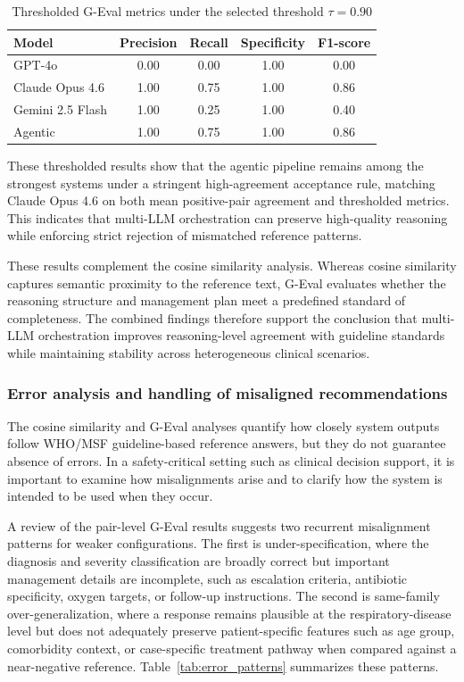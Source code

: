 \documentclass[preprint,12pt]{elsarticle}
\begin{document}
\begin{table}[!ht]
\centering
\caption{Thresholded G-Eval metrics under the selected threshold \(\tau = 0.90\)}
\label{tab:metrics_llms}
\renewcommand{\arraystretch}{1.2}
\small
\begin{tabular}{|l|c|c|c|c|}
\hline
\textbf{Model} & \textbf{Precision} & \textbf{Recall} & \textbf{Specificity} & \textbf{F1-score} \\
\hline
GPT-4o & 0.00 & 0.00 & 1.00 & 0.00 \\
Claude Opus 4.6 & 1.00 & 0.75 & 1.00 & 0.86 \\
Gemini 2.5 Flash & 1.00 & 0.25 & 1.00 & 0.40 \\
Agentic & 1.00 & 0.75 & 1.00 & 0.86 \\
\hline
\end{tabular}
\end{table}

These thresholded results show that the agentic pipeline remains among the strongest systems under a stringent high-agreement acceptance rule, matching Claude Opus 4.6 on both mean positive-pair agreement and thresholded metrics. This indicates that multi-LLM orchestration can preserve high-quality reasoning while enforcing strict rejection of mismatched reference patterns.

These results complement the cosine similarity analysis. Whereas cosine similarity captures semantic proximity to the reference text, G-Eval evaluates whether the reasoning structure and management plan meet a predefined standard of completeness. The combined findings therefore support the conclusion that multi-LLM orchestration improves reasoning-level agreement with guideline standards while maintaining stability across heterogeneous clinical scenarios.

\subsubsection{Error analysis and handling of misaligned recommendations}

The cosine similarity and G-Eval analyses quantify how closely system outputs follow WHO/MSF guideline-based reference answers, but they do not guarantee absence of errors. In a safety-critical setting such as clinical decision support, it is important to examine how misalignments arise and to clarify how the system is intended to be used when they occur.

A review of the pair-level G-Eval results suggests two recurrent misalignment patterns for weaker configurations. The first is under-specification, where the diagnosis and severity classification are broadly correct but important management details are incomplete, such as escalation criteria, antibiotic specificity, oxygen targets, or follow-up instructions. The second is same-family over-generalization, where a response remains plausible at the respiratory-disease level but does not adequately preserve patient-specific features such as age group, comorbidity context, or case-specific treatment pathway when compared against a near-negative reference. Table~\ref{tab:error_patterns} summarizes these patterns.
\end{document}
